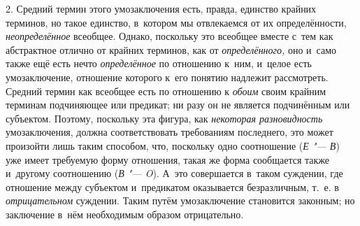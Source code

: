 2. Средний термин этого умозаключения есть, правда, единство
крайних терминов, но такое единство, в~котором мы отвлекаемся от их
определённости, {\em неопределённое}
всеобщее. Однако, поскольку это всеобщее вместе с~тем как
абстрактное отлично от крайних терминов, как от
{\em определённого,} оно
и~само также ещё есть нечто
{\em определённое} по
отношению к~ним, и~целое есть умозаключение, отношение которого к~его
понятию надлежит рассмотреть. Средний термин как всеобщее есть по отношению
к {\em обоим} своим
крайним терминам подчиняющее или предикат; ни разу он не является
подчинённым или субъектом. Поэтому, поскольку эта фигура, как
{\em некоторая разновидность}
умозаключения, должна соответствовать требованиям последнего,
это может произойти лишь таким способом, что, поскольку одно соотношение
({\em Е "--- В})
уже имеет требуемую форму отношения, такая же форма
сообщается также и~другому соотношению
({\em В "--- O}). А~это
совершается в~таком суждении, где отношение между субъектом и~предикатом
оказывается безразличным, т.~е. в
{\em отрицательном}
суждении. Таким путём умозаключение становится законным; но
заключение в~нём необходимым образом
отрицательно.

